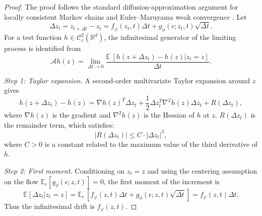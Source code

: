 \begin{proof}
The proof follows the standard diffusion-approximation argument for locally consistent Markov chains and Euler--Maruyama weak convergence \citep{KushnerDupuis2001,EthierKurtz1986,kloeden1992numerical}. Let
\begin{equation}
    \Delta z_t = z_{t+\Delta t}-z_t
    = f_\varphi(z_t,t)\Delta t
    + g_\phi(\epsilon;z_t,t)\sqrt{\Delta t}.
\end{equation}
For a test function $h\in\mathcal{C}_c^2(\mathbb{R}^d)$, the infinitesimal generator of the limiting process is identified from
\begin{equation}
    \mathcal{A}h(z)
    =
    \lim_{\Delta t\to 0}
    \frac{
        \mathbb{E}\,\left[h(z+\Delta z_t)-h(z)| z_t=z\right]
    }{\Delta t}.
    \label{eq:flow_sde_generator_definition}
\end{equation}

\medskip
\noindent\textit{Step 1: Taylor expansion.}
A second-order multivariate Taylor expansion around $z$ gives
\begin{equation}
    h(z+\Delta z_t)-h(z)
    =
    \nabla h(z)^T\Delta z_t
    +\frac{1}{2}\Delta z_t^T\nabla^2h(z)\Delta z_t
    +R(\Delta z_t),
    \label{eq:flow_sde_taylor_expansion}
\end{equation}
where $\nabla h(z)$ is the gradient and $\nabla^2h(z)$ is the Hessian of $h$ at $z$. $R(\Delta z_t)$ is the remainder term, which satisfies:
\begin{equation}
    |R(\Delta z_t)| \leq C \cdot |\Delta z_t|^3,
\end{equation}
where $C>0$ is a constant related to the maximum value of the third derivative of $h$.

\medskip
\noindent\textit{Step 2: First moment.}
Conditioning on $z_t=z$ and using the centering assumption on the flow $\mathbb{E}_{\epsilon}[g_\phi(\epsilon;z,t)]=0$, the first moment of the increment is
\begin{equation}
    \mathbb{E}[\Delta z_t| z_t=z]
    =
    \mathbb{E}_{\epsilon}\,\left[
        f_\varphi(z,t)\Delta t
        +g_\phi(\epsilon;z,t)\sqrt{\Delta t}
    \right] 
    =
    f_\varphi(z,t)\Delta t.
    \label{eq:flow_sde_first_moment}
\end{equation}
Thus the infinitesimal drift is $f_\varphi(z,t)$.


\end{proof}
